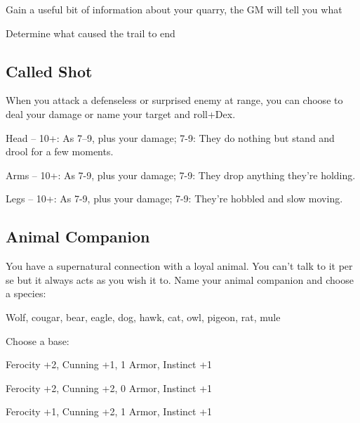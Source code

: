  
\startitemize[1,packed]

\item Gain a useful bit of information about your quarry, the GM will tell you what

 
\item Determine what caused the trail to end


\stopitemize
 
\subsection{Called Shot}    
 

When you attack a defenseless or surprised enemy at range, you can choose to deal your damage or name your target and roll+Dex.

 
\startitemize[1,packed]

\item Head – 10+: As 7–9, plus your damage; 7-9: They do nothing but stand and drool for a few moments.

 
\item Arms – 10+: As 7-9, plus your damage; 7-9: They drop anything they're holding.

 
\item Legs – 10+: As 7-9, plus your damage; 7-9: They're hobbled and slow moving.


\stopitemize
 
\subsection{Animal Companion}    
 

You have a supernatural connection with a loyal animal. You can't talk to it per se but it always acts as you wish it to. Name your animal companion and choose a species:

 
\startExample
Wolf, cougar, bear, eagle, dog, hawk, cat, owl, pigeon, rat, mule
\stopExample
 

Choose a base:

 
\startitemize[1,packed]

\item Ferocity +2, Cunning +1, 1 Armor, Instinct +1

 
\item Ferocity +2, Cunning +2, 0 Armor, Instinct +1

 
\item Ferocity +1, Cunning +2, 1 Armor, Instinct +1

